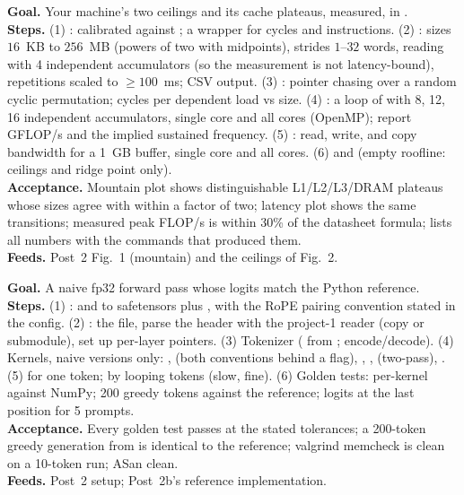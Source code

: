 \textbf{Goal.} Your machine's two ceilings and its cache plateaus, measured, in .\\
\textbf{Steps.} (1) :  calibrated against ; a  wrapper for cycles and instructions. (2) : sizes $16$~KB to $256$~MB (powers of two with midpoints), strides $1$--$32$ words, reading with 4 independent accumulators (so the measurement is not latency-bound), repetitions scaled to $\ge 100$~ms; CSV output. (3) : pointer chasing over a random cyclic permutation; cycles per dependent load vs size. (4) : a loop of  with 8, 12, 16 independent accumulators, single core and all cores (OpenMP); report GFLOP/s and the implied sustained frequency. (5) : read, write, and copy bandwidth for a 1~GB buffer, single core and all cores. (6)  and  (empty roofline: ceilings and ridge point only).\\
\textbf{Acceptance.} Mountain plot shows distinguishable L1/L2/L3/DRAM plateaus whose sizes agree with  within a factor of two; latency plot shows the same transitions; measured peak FLOP/s is within 30\% of the datasheet formula;  lists all numbers with the commands that produced them.\\
\textbf{Feeds.} Post~2 Fig.~1 (mountain) and the ceilings of Fig.~2.

\textbf{Goal.} A naive fp32 forward pass whose logits match the Python reference.\\
\textbf{Steps.} (1) :  and  to safetensors plus , with the RoPE pairing convention stated in the config. (2) :  the file, parse the header with the project-1 reader (copy or submodule), set up per-layer pointers. (3) Tokenizer ( from ; encode/decode). (4) Kernels, naive versions only: ,  (both conventions behind a flag), , ,  (two-pass), . (5)  for one token;  by looping tokens (slow, fine). (6) Golden tests: per-kernel against NumPy; 200 greedy tokens against the reference; logits at the last position for 5 prompts.\\
\textbf{Acceptance.} Every golden test passes at the stated tolerances; a 200-token greedy generation from  is identical to the reference; valgrind memcheck is clean on a 10-token run; ASan clean.\\
\textbf{Feeds.} Post~2 setup; Post~2b's reference implementation.

